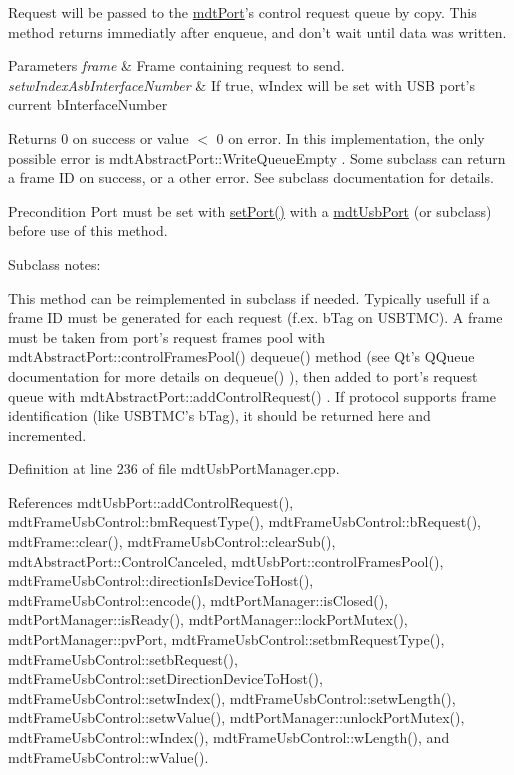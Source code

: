 Request will be passed to the \hyperlink{classmdt_port}{mdt\-Port}'s control request queue by copy. This method returns immediatly after enqueue, and don't wait until data was written.


\begin{DoxyParams}{Parameters}
{\em frame} & Frame containing request to send. \\
\hline
{\em setw\-Index\-Asb\-Interface\-Number} & If true, w\-Index will be set with U\-S\-B port's current b\-Interface\-Number \\
\hline
\end{DoxyParams}
\begin{DoxyReturn}{Returns}
0 on success or value $<$ 0 on error. In this implementation, the only possible error is mdt\-Abstract\-Port\-::\-Write\-Queue\-Empty . Some subclass can return a frame I\-D on success, or a other error. See subclass documentation for details. 
\end{DoxyReturn}
\begin{DoxyPrecond}{Precondition}
Port must be set with \hyperlink{classmdt_port_manager_afcd156b2d0c9d340999935efb6cd8cb6}{set\-Port()} with a \hyperlink{classmdt_usb_port}{mdt\-Usb\-Port} (or subclass) before use of this method.
\end{DoxyPrecond}
Subclass notes\-:\par
 This method can be reimplemented in subclass if needed. Typically usefull if a frame I\-D must be generated for each request (f.\-ex. b\-Tag on U\-S\-B\-T\-M\-C). A frame must be taken from port's request frames pool with mdt\-Abstract\-Port\-::control\-Frames\-Pool() dequeue() method (see Qt's Q\-Queue documentation for more details on dequeue() ), then added to port's request queue with mdt\-Abstract\-Port\-::add\-Control\-Request() . If protocol supports frame identification (like U\-S\-B\-T\-M\-C's b\-Tag), it should be returned here and incremented. 

Definition at line 236 of file mdt\-Usb\-Port\-Manager.\-cpp.



References mdt\-Usb\-Port\-::add\-Control\-Request(), mdt\-Frame\-Usb\-Control\-::bm\-Request\-Type(), mdt\-Frame\-Usb\-Control\-::b\-Request(), mdt\-Frame\-::clear(), mdt\-Frame\-Usb\-Control\-::clear\-Sub(), mdt\-Abstract\-Port\-::\-Control\-Canceled, mdt\-Usb\-Port\-::control\-Frames\-Pool(), mdt\-Frame\-Usb\-Control\-::direction\-Is\-Device\-To\-Host(), mdt\-Frame\-Usb\-Control\-::encode(), mdt\-Port\-Manager\-::is\-Closed(), mdt\-Port\-Manager\-::is\-Ready(), mdt\-Port\-Manager\-::lock\-Port\-Mutex(), mdt\-Port\-Manager\-::pv\-Port, mdt\-Frame\-Usb\-Control\-::setbm\-Request\-Type(), mdt\-Frame\-Usb\-Control\-::setb\-Request(), mdt\-Frame\-Usb\-Control\-::set\-Direction\-Device\-To\-Host(), mdt\-Frame\-Usb\-Control\-::setw\-Index(), mdt\-Frame\-Usb\-Control\-::setw\-Length(), mdt\-Frame\-Usb\-Control\-::setw\-Value(), mdt\-Port\-Manager\-::unlock\-Port\-Mutex(), mdt\-Frame\-Usb\-Control\-::w\-Index(), mdt\-Frame\-Usb\-Control\-::w\-Length(), and mdt\-Frame\-Usb\-Control\-::w\-Value().



